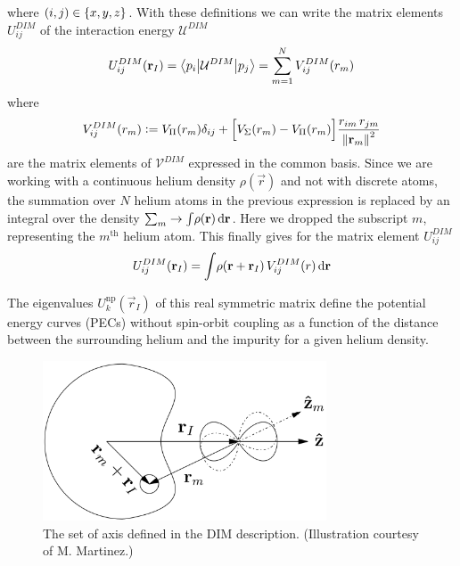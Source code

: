 			where $(i,j)\in\qty{x,y,z}$. With these definitions we can write the matrix elements $U^{DIM}_{ij}$ of the interaction energy $\mathcal{U}^{DIM}$
			\begin{align}
				U^{DIM}_{ij}(\bm{\mathrm{r}}_I)=\mel**{p_i}{\mathcal{U}^{DIM}}{p_j} = \sum_{m=1}^{N} V^{DIM}_{ij}(r_m)
			\end{align}
			where
			\begin{align}
				V^{DIM}_{ij}(r_m) \vcentcolon= V_\Pi(r_m)\delta_{ij}+\qty\Big[V_\Sigma(r_m)-V_\Pi(r_m)]\frac{r_{im}\,r_{jm}}{\norm{\bm{\mathrm{r}}_m}^2} \label{eq:vdim}
			\end{align}
			are the matrix elements of $\mathcal{V}^{DIM}$ expressed in the common basis. Since we are working with a continuous helium density $\rho(\vec{r})$ and not with discrete atoms, the summation over $N$ helium atoms in the previous expression is replaced by an integral over the density $\sum_m\rightarrow\int\!\rho(\bm{\mathrm{r}})\,\mathrm{d}{\bm{\mathrm{r}}}$. Here we dropped the subscript $m$, representing the $m^\mathrm{th}$ helium atom. This finally gives for the matrix element $U^{DIM}_{ij}$
			\begin{align}
				U^{DIM}_{ij}(\bm{\mathrm{r}}_I) = \int\! \rho\qty(\bm{\mathrm{r}}+\bm{\mathrm{r}}_I)\,V^{DIM}_{ij}(r)\,\mathrm{d}{\bm{\mathrm{r}}} \label{eq:u-dim}
			\end{align}
			
			The eigenvalues $U^{\mathrm{np}}_k(\vec{r}_I)$ of this real symmetric matrix define the potential energy curves (PECs) without spin-orbit coupling as a function of the distance between the surrounding helium and the impurity for a given helium density.
			\begin{figure}[t]
				\begin{center}
					\includegraphics[width=0.75\textwidth]{dim-axes}
				\end{center}
				\caption{The set of axis defined in the DIM description. (Illustration courtesy of M. Martinez\citep{Martinez2017}.)}
				\label{fig:dim-axes}
			\end{figure}			
		

